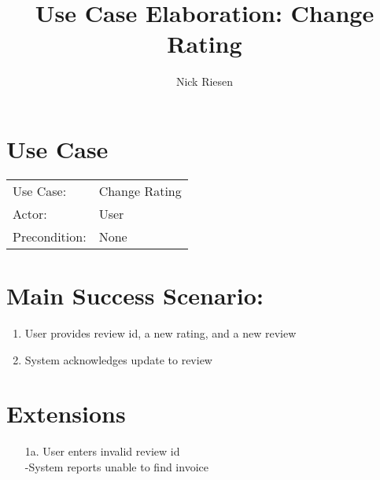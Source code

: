 \documentclass{article}
\title{Use Case Elaboration: Change Rating}
\author{ Nick Riesen }
\begin{document}
\maketitle


\section*{Use Case}
\begin{tabular}{l l}
Use Case:     & Change Rating                 \\
Actor:        & User                          \\
Precondition: & None                          \\
\end{tabular}


\section*{Main Success Scenario:}

\begin{enumerate}
    \item  User provides review id, a new rating, and a new review
    \item System acknowledges update to review

\end{enumerate}

\section*{Extensions}

\begin{itemize}
    \item [1a.] User enters invalid review id \\
        -System reports unable to find invoice

\end{itemize}
\end{document}
